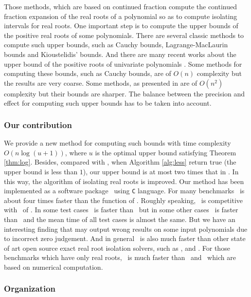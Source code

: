 Those methods, which are  based on  continued fraction compute the continued fraction expansion of the real roots of a polynomial so as to  compute isolating intervals for real roots. One important step
is to  compute the upper bounds of the positive real roots of some polynomials. There are  several classic methods to compute such upper bounds, such as Cauchy bounds, Lagrange-MacLaurin  bounds and Kioustelidis' bounds. And there are many recent works about the upper bound of the positive roots of univariate polynomials \cite{hong98,ste05,akr08}. Some methods for computing these bounds,  such as Cauchy bounds, are of $O(n)$ complexity but the results are very coarse. Some methods, as presented in  \cite{akr08} are of $O(n^2)$ complexity but their bounds are sharper. The balance between the precision and effect for computing such upper bounds has to be taken into account.
\subsubsection{Our contribution}
We provide a new method for computing such bounds with time complexity $O(n\log(u+1))$, where $u$ is the optimal upper bound satisfying Theorem \ref{thm:log}. Besides, compared
with \cite{akr08}, when  Algorithm \ref{alg:less} return true (the upper bound is less than $1$), our upper bound is at most two times that in \cite{akr08}. In this way, the algorithm of   isolating real roots is improved.  Our  method has been implemented as a  software package \froot\ using \texttt{C} language. For many benchmarks \froot \  is about four  times
faster   than  the function {\tt \REALROOT} of \MAPLE. Roughly speaking, \froot\ is competitive with \inte\ of \MM. In some test cases \froot\ is faster than \inte\ but in some other cases \inte\ is faster than \froot\ and the mean time of all test cases is almost the same. But we have an interesting finding that {\tt \inte} may output wrong results on some input polynomials due to incorrect zero judgement. %
And in general \froot\ is also much faster than other state of art
open source exact real root isolation solvers, such as \cf, \AND and \SLV. For those  benchmarks which  have only real roots, \froot\ is much faster than \sle\ and \eign\ which are based on numerical computation.

\subsubsection{Organization}
